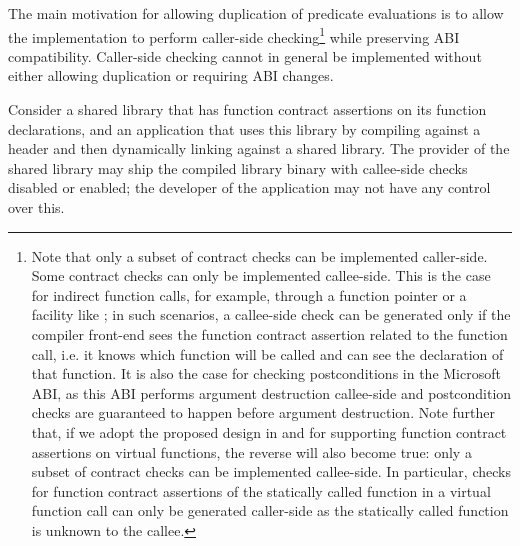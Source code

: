 The main motivation for allowing duplication of predicate evaluations is to allow the implementation to perform caller-side checking\footnote{Note that only a subset of contract checks can be implemented caller-side. Some contract checks can only be implemented callee-side. This is the case for indirect function calls, for example, through a function pointer or a facility like ; in such scenarios, a callee-side check can be generated only if the compiler front-end sees the function contract assertion related to the function call, i.e. it knows which function will be called and can see the declaration of that function. It is also the case for checking postconditions in the Microsoft ABI, as this ABI performs argument destruction callee-side and postcondition checks are guaranteed to happen before argument destruction. Note further that, if we adopt the proposed design in \cite{P3097R0} and \cite{P3165R0} for supporting function contract assertions on virtual functions, the reverse will also become true: only a subset of contract checks can be implemented callee-side. In particular, checks for function contract assertions of the statically called function in a virtual function call can only be generated caller-side as the statically called function is unknown to the callee.} while preserving ABI compatibility. Caller-side checking cannot in general be implemented without either allowing duplication or requiring ABI changes.

Consider a shared library that has function contract assertions on its function declarations, and an application that uses this library by compiling against a header and then dynamically linking against a shared library. The provider of the shared library may ship the compiled library binary with callee-side checks disabled or enabled; the developer of the application may not have any control over this.

